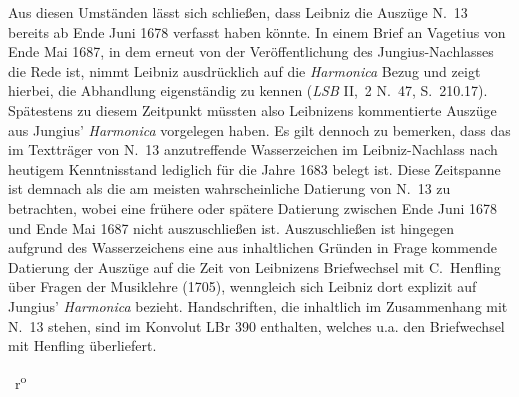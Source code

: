 \begin{ledgroup}
Aus diesen Umständen lässt sich schließen, dass Leibniz die Auszüge N.~13 bereits ab Ende Juni 1678 verfasst haben könnte.
\pend
\pstart
In einem Brief an Vagetius\protect{} von Ende Mai 1687, in dem erneut von der Veröffentlichung des Jun\-gius-Nach\-las\-ses\protect{} die Rede ist, nimmt Leibniz ausdrücklich auf die \textit{Harmonica} Bezug und zeigt hierbei, die Abhandlung eigenständig zu kennen (\cite{01273}\textit{LSB} II,~2 N.~47, S.~210.17).
Spätestens zu diesem Zeitpunkt müssten also Leibnizens kommentierte Auszüge aus Jungius' \textit{Harmonica} vorgelegen haben.
\pend
\pstart
Es gilt dennoch zu bemerken, dass das im Textträger von N.~13 anzutreffende Wasserzeichen im Leibniz-Nachlass nach heutigem Kenntnisstand lediglich für die Jahre 1683 belegt ist.
Diese Zeit\-spanne ist demnach als die am meisten wahrscheinliche Datierung von N.~13 zu betrachten, wobei eine frühere oder spätere Datierung zwischen Ende Juni 1678 und Ende Mai 1687 nicht auszuschließen ist.
Auszuschließen ist hingegen aufgrund des Wasserzeichens eine aus inhaltlichen Gründen in Frage kommende Datierung der Auszüge auf die Zeit von Leibnizens Briefwechsel mit C.~Henfling\protect{} über Fragen der Musiklehre (1705), wenngleich sich Leibniz dort explizit auf Jungius' \textit{Harmonica} bezieht.
Handschriften, die inhaltlich im Zusammenhang mit N.~13 stehen, sind im Konvolut LBr 390 enthalten, welches u.a. den Briefwechsel mit Henfling überliefert.
\pend
\end{ledgroup}
\newpage%
%
%
%
\count{}
\count{}
\count{}
%
%
\pstart%
\normalsize%
\noindent%
%
~r\textsuperscript{o}\rbrack\ %
%

